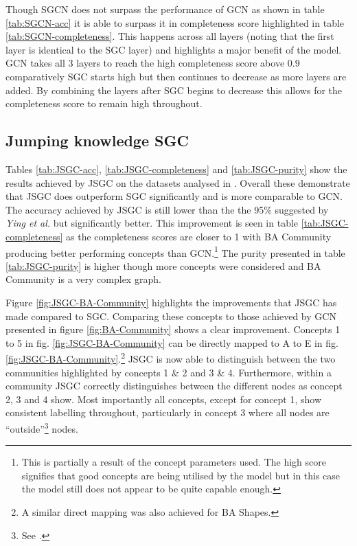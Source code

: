 Though SGCN does not surpass the performance of GCN as shown in table \ref{tab:SGCN-acc} it is able to surpass it in completeness score highlighted in table \ref{tab:SGCN-completeness}.
This happens across all layers (noting that the first layer is identical to the SGC layer) and highlights a major benefit of the model.
GCN takes all 3 layers to reach the high completeness score above $0.9$ comparatively SGC starts high but then continues to decrease as more layers are added.
By combining the layers after SGC begins to decrease this allows for the completeness score to remain high throughout.

\subsection{Jumping knowledge SGC}
\label{sec:Jump-SGC}





Tables \ref{tab:JSGC-acc}, \ref{tab:JSGC-completeness} and \ref{tab:JSGC-purity} show the results achieved by JSGC on the datasets analysed in .
Overall these demonstrate that JSGC does outperform SGC significantly and is more comparable to GCN.
The accuracy achieved by JSGC is still lower than the the 95\% suggested by \textit{Ying et al.}\cite{ying2019gnnexplainer} but significantly better.
This improvement is seen in table \ref{tab:JSGC-completeness} as the completeness scores are closer to 1 with BA Community producing better performing concepts than GCN.\footnote{This is partially a result of the concept parameters used. The high score signifies that good concepts are being utilised by the model but in this case the model still does not appear to be quite capable enough.}
The purity presented in table \ref{tab:JSGC-purity} is higher though more concepts were considered and BA Community is a very complex graph.


Figure \ref{fig:JSGC-BA-Community} highlights the improvements that JSGC has made compared to SGC.
Comparing these concepts to those achieved by GCN presented in figure \ref{fig:BA-Community} shows a clear improvement.
Concepts 1 to 5 in fig. \ref{fig:JSGC-BA-Community} can be directly mapped to A to E in fig. \ref{fig:JSGC-BA-Community}.\footnote{A similar direct mapping was also achieved for BA Shapes.}
JSGC is now able to distinguish between the two communities highlighted by concepts 1 \& 2 and 3 \& 4.
Furthermore, within a community JSGC correctly distinguishes between the different nodes as concept 2, 3 and 4 show.
Most importantly all concepts, except for concept 1, show consistent labelling throughout, particularly in concept 3 where all nodes are ``outside''\footnote{See .} nodes.

